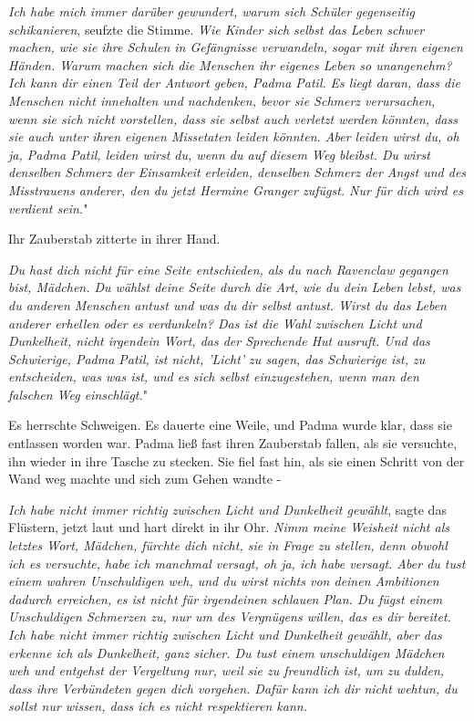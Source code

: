 \glqq{}\emph{Ich habe mich immer darüber gewundert, warum sich Schüler
gegenseitig schikanieren}\grqq{}, seufzte die Stimme. \glqq{}\emph{Wie Kinder
sich selbst das Leben schwer machen, wie sie ihre Schulen in Gefängnisse
verwandeln, sogar mit ihren eigenen Händen. Warum machen sich die Menschen ihr
eigenes Leben so unangenehm? Ich kann dir einen Teil der Antwort geben, Padma
Patil.} \emph{ Es liegt daran, dass die Menschen nicht innehalten und
nachdenken, bevor sie Schmerz verursachen, wenn sie sich nicht vorstellen, dass
sie selbst auch verletzt werden könnten, dass sie auch unter ihren eigenen
Missetaten leiden könnten. Aber leiden wirst du, oh ja, Padma Patil, leiden
wirst du, wenn du auf diesem Weg bleibst. Du wirst denselben Schmerz der
Einsamkeit erleiden, denselben Schmerz der Angst und des Misstrauens anderer,
den du jetzt Hermine Granger zufügst. Nur für dich wird es verdient sein.}"

Ihr Zauberstab zitterte in ihrer Hand.

\glqq{}\emph{Du hast dich nicht für eine Seite entschieden, als du nach Ravenclaw
gegangen bist, Mädchen. Du wählst deine Seite durch die Art, wie du dein Leben
lebst, was du anderen Menschen antust und was du dir selbst antust. Wirst du das
Leben anderer erhellen oder es verdunkeln? Das ist die Wahl zwischen Licht und
Dunkelheit, nicht irgendein Wort, das der Sprechende Hut ausruft. Und das
Schwierige, Padma Patil, ist nicht, 'Licht' zu sagen, das Schwierige ist, zu
entscheiden, was was ist, und es sich selbst einzugestehen, wenn man den
falschen Weg einschlägt.}"

Es herrschte Schweigen. Es dauerte eine Weile, und Padma wurde klar, dass sie
entlassen worden war. Padma ließ fast ihren Zauberstab fallen, als sie
versuchte, ihn wieder in ihre Tasche zu stecken. Sie fiel fast hin, als sie
einen Schritt von der Wand weg machte und sich zum Gehen wandte -

\glqq{}\emph{Ich habe nicht immer richtig zwischen Licht und Dunkelheit
gewählt}\grqq{}, sagte das Flüstern, jetzt laut und hart direkt in ihr Ohr.
\glqq{}\emph{Nimm meine Weisheit nicht als letztes Wort, Mädchen, fürchte dich
nicht, sie in Frage zu stellen, denn obwohl ich es versuchte, habe ich manchmal
versagt, oh ja, ich habe versagt. Aber du tust einem wahren Unschuldigen weh,
und du wirst nichts von deinen Ambitionen dadurch erreichen, es ist nicht für
irgendeinen schlauen Plan. Du fügst einem Unschuldigen Schmerzen zu, nur um des
Vergnügens willen, das es dir bereitet. Ich habe nicht immer richtig zwischen
Licht und Dunkelheit gewählt, aber das erkenne ich als Dunkelheit, ganz sicher.
Du tust einem unschuldigen Mädchen weh und entgehst der Vergeltung nur, weil sie
zu freundlich ist, um zu dulden, dass ihre Verbündeten gegen dich vorgehen.
Dafür kann ich dir nicht wehtun, du sollst nur wissen, dass ich es nicht
respektieren kann.}

